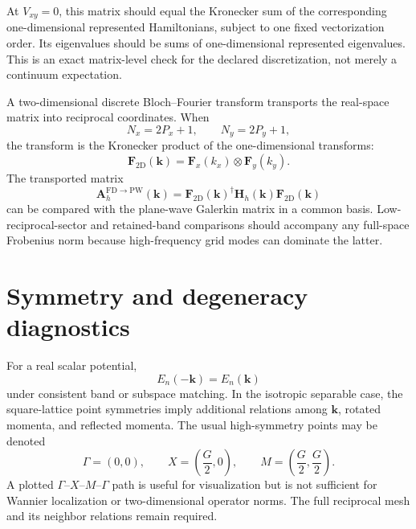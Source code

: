 At $V_{xy}=0$, this matrix should equal the Kronecker sum of the corresponding
one-dimensional represented Hamiltonians, subject to one fixed vectorization
order. Its eigenvalues should be sums of one-dimensional represented
eigenvalues. This is an exact matrix-level check for the declared discretization,
not merely a continuum expectation.

A two-dimensional discrete Bloch--Fourier transform transports the real-space
matrix into reciprocal coordinates. When
\begin{equation}
    N_x=2P_x+1,
    \qquad
    N_y=2P_y+1,
\end{equation}
the transform is the Kronecker product of the one-dimensional transforms:
\begin{equation}
    \mathbf F_{2\mathrm D}(\mathbf k)
    =
    \mathbf F_x(k_x)\otimes\mathbf F_y(k_y).
\end{equation}
The transported matrix
\begin{equation}
    \mathbf A_h^{\mathrm{FD}\rightarrow\mathrm{PW}}(\mathbf k)
    =
    \mathbf F_{2\mathrm D}(\mathbf k)^\dagger
    \mathbf H_h(\mathbf k)
    \mathbf F_{2\mathrm D}(\mathbf k)
\end{equation}
can be compared with the plane-wave Galerkin matrix in a common basis.
Low-reciprocal-sector and retained-band comparisons should accompany any
full-space Frobenius norm because high-frequency grid modes can dominate the
latter.

\section{Symmetry and degeneracy diagnostics}

For a real scalar potential,
\begin{equation}
    E_n(-\mathbf k)=E_n(\mathbf k)
\end{equation}
under consistent band or subspace matching. In the isotropic separable case,
the square-lattice point symmetries imply additional relations among
$\mathbf k$, rotated momenta, and reflected momenta. The usual high-symmetry
points may be denoted
\begin{equation}
    \Gamma=(0,0),
    \qquad
    X=\left(\frac{G}{2},0\right),
    \qquad
    M=\left(\frac{G}{2},\frac{G}{2}\right).
\end{equation}
A plotted $\Gamma$--$X$--$M$--$\Gamma$ path is useful for visualization but is
not sufficient for Wannier localization or two-dimensional operator norms. The
full reciprocal mesh and its neighbor relations remain required.

